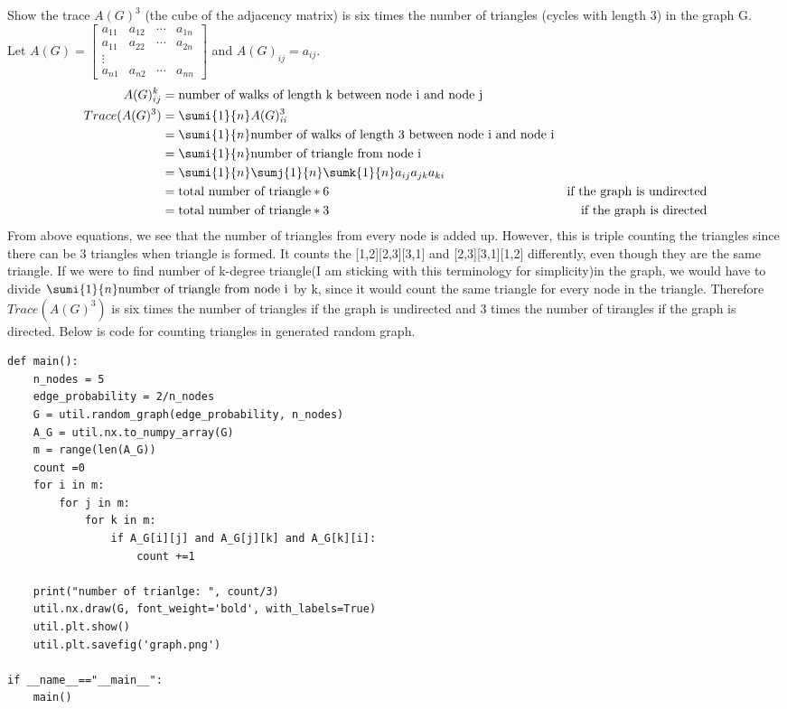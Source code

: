 \documentclass{article}
\begin{document}
\begin{problem}
    Show the trace $A(G)^3$ (the cube of the adjacency matrix) is six times the number of triangles (cycles with length 3) in the graph G.\\
    Let $A(G) = \begin{bmatrix*}
        a_{11} & a_{12} & \cdots & a_{1n} \\
        a_{11} & a_{22} & \cdots & a_{2n} \\
        \vdots & &&\\
        a_{n1} & a_{n2} & \cdots & a_{nn}
    \end{bmatrix*}$ and $A(G)_{ij} = a_{ij}$.
    \begin{align*}
         A(G)_{ij} ^k &= \text{number of walks of length k between node i and node j}\\
         Trace(A(G)^3) &= \sumi{1}{n} A(G)_{ii}^3 \\
         &= \sumi{1}{n} \text{number of walks of length 3 between node i and node i} \\
         &= \sumi{1}{n} \text{number of triangle from node i} \\
         &= \sumi{1}{n} \sumj{1}{n} \sumk{1}{n}a_{ij} a_{jk} a_{ki}\\
         &= \text{total number of triangle} * 6  & \text{if the graph is undirected}\\
         &= \text{total number of triangle} * 3  & \text{if the graph is directed}
    \end{align*}
    From above equations, we see that the number of triangles from every node is added up. However, this is triple counting the triangles since there can be 3 triangles when triangle is formed. It counts the [1,2][2,3][3,1] and [2,3][3,1][1,2] differently, even though they are the same triangle.  If we were to find number of k-degree triangle(I am sticking with this terminology for simplicity)in the graph, we would have to divide $\sumi{1}{n} \text{number of triangle from node i}$ by k, since it would count the same triangle for every node in the triangle. Therefore $Trace(A(G)^3)$ is six times the number of triangles if the graph is undirected and 3 times the number of tirangles if the graph is directed. Below is code for counting triangles in generated random graph.
    \begin{verbatim}
def main(): 
    n_nodes = 5
    edge_probability = 2/n_nodes
    G = util.random_graph(edge_probability, n_nodes)
    A_G = util.nx.to_numpy_array(G)
    m = range(len(A_G))
    count =0
    for i in m:
        for j in m:
            for k in m:
                if A_G[i][j] and A_G[j][k] and A_G[k][i]:
                    count +=1

    print("number of trianlge: ", count/3)
    util.nx.draw(G, font_weight='bold', with_labels=True)
    util.plt.show()
    util.plt.savefig('graph.png')

if __name__=="__main__": 
    main() 
    \end{verbatim}
\end{problem}
\end{document}
